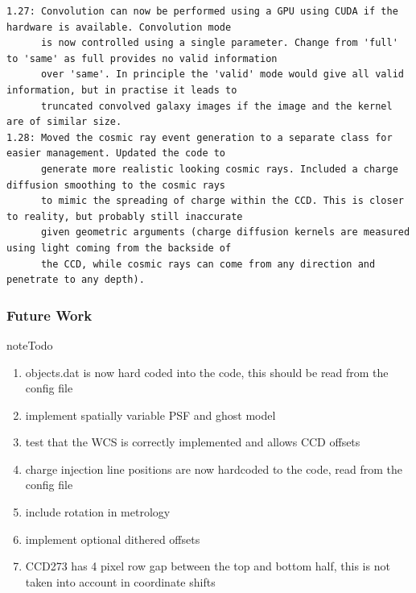 \documentclass[a4paper,11pt,english]{sphinxmanual}
\begin{document}
\begin{Verbatim}[commandchars=\\\{\}]
1.27: Convolution can now be performed using a GPU using CUDA if the hardware is available. Convolution mode
      is now controlled using a single parameter. Change from 'full' to 'same' as full provides no valid information
      over 'same'. In principle the 'valid' mode would give all valid information, but in practise it leads to
      truncated convolved galaxy images if the image and the kernel are of similar size.
1.28: Moved the cosmic ray event generation to a separate class for easier management. Updated the code to
      generate more realistic looking cosmic rays. Included a charge diffusion smoothing to the cosmic rays
      to mimic the spreading of charge within the CCD. This is closer to reality, but probably still inaccurate
      given geometric arguments (charge diffusion kernels are measured using light coming from the backside of
      the CCD, while cosmic rays can come from any direction and penetrate to any depth).
\end{Verbatim}


\subsubsection{Future Work}
\label{simulator:future-work}
\begin{notice}{note}{Todo}
\begin{enumerate}
\item {} 
objects.dat is now hard coded into the code, this should be read from the config file

\item {} 
implement spatially variable PSF and ghost model

\item {} 
test that the WCS is correctly implemented and allows CCD offsets

\item {} 
charge injection line positions are now hardcoded to the code, read from the config file

\item {} 
include rotation in metrology

\item {} 
implement optional dithered offsets

\item {} 
CCD273 has 4 pixel row gap between the top and bottom half, this is not taken into account in coordinate shifts

\end{enumerate}
\end{notice}
\end{document}

